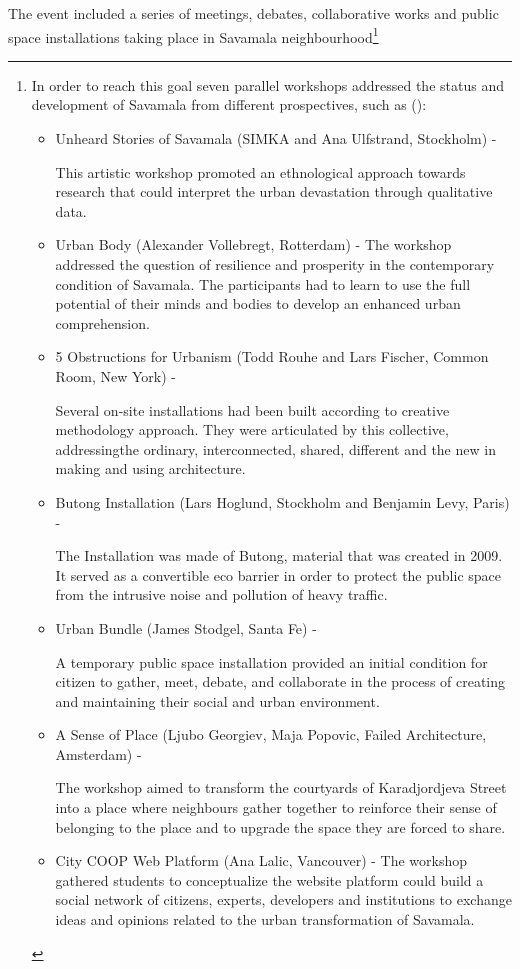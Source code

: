 \documentclass[11pt]{report}
\begin{document}
The event included a series of meetings, debates, collaborative works and public space installations taking place in Savamala neighbourhood\footnote{In order to reach this goal seven parallel workshops addressed the status and development of Savamala from different prospectives, such as (\cite{Cvetinovic et al 2013}):
\begin{itemize}

\item Unheard Stories of Savamala (SIMKA and Ana Ulfstrand, Stockholm) -

This artistic workshop promoted an ethnological approach towards research that could interpret the urban devastation through qualitative data. 

\item Urban Body (Alexander Vollebregt, Rotterdam) -
The workshop addressed the question of resilience and prosperity in the contemporary condition of Savamala. The participants had to learn to use the full potential of their minds and bodies to develop an enhanced urban comprehension.

\item 5 Obstructions for Urbanism (Todd Rouhe and Lars Fischer, Common Room, New York) -

Several on-site installations had been built according to creative methodology approach. They were articulated by this collective, addressingthe  ordinary, interconnected, shared, different and the new in making and using architecture.

\item Butong Installation (Lars Hoglund, Stockholm and Benjamin Levy, Paris) - 

The Installation was made of Butong, material that was created in 2009. It served as a convertible eco barrier in order to protect the public space from the intrusive noise and pollution of heavy traffic.

\item Urban Bundle (James Stodgel, Santa Fe) -

A temporary public space installation provided an initial condition for citizen to gather, meet, debate, and collaborate in the process of creating and maintaining their social and urban environment.  

\item A Sense of Place (Ljubo Georgiev, Maja Popovic, Failed Architecture, Amsterdam) -

The workshop aimed to transform the courtyards of Karadjordjeva Street  into a place where neighbours gather together to reinforce their sense of belonging to the place and to upgrade the space they are forced to share.

\item City COOP Web Platform (Ana Lalic, Vancouver) -
The workshop gathered students to conceptualize the website platform could build a social network of citizens, experts, developers and institutions to exchange ideas and opinions related to the urban transformation of Savamala.  
\end{itemize}
}
\end{document}
